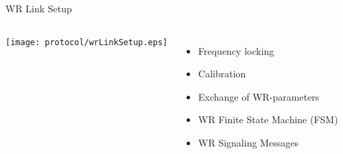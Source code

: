 \documentclass[compress,red]{beamer}
\begin{document}
\begin{frame}{WR Link Setup }

  \begin{columns}[c]

      \begin{center}
      \texttt{[image: protocol/wrLinkSetup.eps]}
      \end{center}



      \begin{itemize}
	\item Frequency locking
	\item Calibration
	\item Exchange of WR-parameters
	\item WR Finite State Machine (FSM)
	\item WR Signaling Messages
      \end{itemize}

  \end{columns}

\end{frame}
% 
% 
% 
\end{document}
